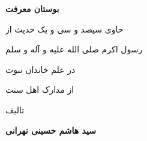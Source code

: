 \begin{titlepage}
\vbox{ }

\vbox{ }

\begin{center}

\vbox{ }

{\huge \bfseries بوستان معرفت}
\vspace{2cm}

حاوی سیصد و سی و یک حدیث از

رسول اکرم صلی الله علیه و آله و سلم

در علم خاندان نبوت

از مدارک اهل سنت

\vspace{1cm}

تالیف

\textbf{سید هاشم حسینی تهرانی}


\end{center}
\end{titlepage}
